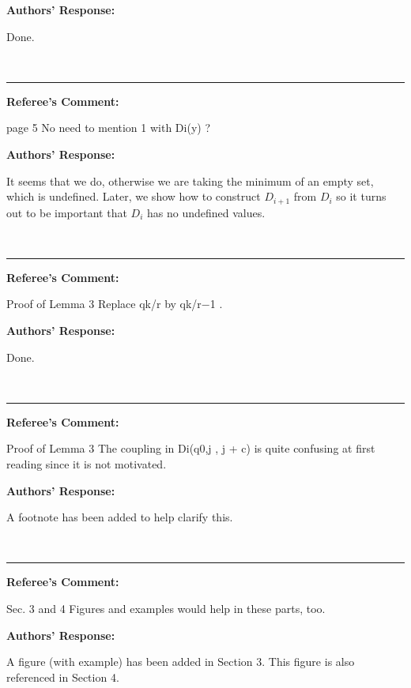 \documentclass{article}
\begin{document}
\noindent\textbf{Authors' Response:}

Done.

\ \ \vspace{2ex}\hrule\vspace{2ex}
\noindent\textbf{Referee's Comment:}

page 5 No need to mention 1 with Di(y) ?

\noindent\textbf{Authors' Response:}

It seems that we do, otherwise we are taking the minimum of an empty
set, which is undefined.  Later, we show how to construct $D_{i+1}$
from $D_i$ so it turns out to be important that $D_i$ has no undefined
values.

\ \ \vspace{2ex}\hrule\vspace{2ex}
\noindent\textbf{Referee's Comment:}

Proof of Lemma 3 Replace qk/r by qk/r−1 .

\noindent\textbf{Authors' Response:}

Done.

\ \ \vspace{2ex}\hrule\vspace{2ex}
\noindent\textbf{Referee's Comment:}

Proof of Lemma 3 The coupling in Di(q0,j , j + c) is quite confusing at first
reading since it is not motivated.

\noindent\textbf{Authors' Response:}

A footnote has been added to help clarify this.


\ \ \vspace{2ex}\hrule\vspace{2ex}
\noindent\textbf{Referee's Comment:}

Sec. 3 and 4 Figures and examples would help in these parts, too.

\noindent\textbf{Authors' Response:}

A figure (with example) has been added in Section 3.  This figure is
also referenced in Section 4.
\end{document}
